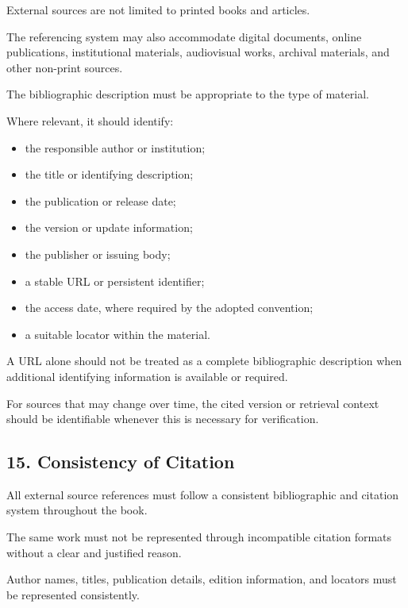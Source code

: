 External sources are not
limited to printed books
and articles.

The referencing system
may also accommodate
digital documents, online
publications, institutional
materials, audiovisual
works, archival materials,
and other non-print sources.

The bibliographic description
must be appropriate to
the type of material.

Where relevant, it should
identify:

\begin{itemize}
    \item the responsible
    author or institution;
    \item the title or identifying
    description;
    \item the publication
    or release date;
    \item the version or
    update information;
    \item the publisher or
    issuing body;
    \item a stable URL or
    persistent identifier;
    \item the access date,
    where required by the
    adopted convention;
    \item a suitable locator
    within the material.
\end{itemize}

A URL alone should not
be treated as a complete
bibliographic description
when additional identifying
information is available
or required.

For sources that may change
over time, the cited version
or retrieval context should
be identifiable whenever
this is necessary for
verification.


\subsection*{15. Consistency of Citation}

All external source references
must follow a consistent
bibliographic and citation
system throughout the book.

The same work must not
be represented through
incompatible citation
formats without a clear
and justified reason.

Author names, titles,
publication details, edition
information, and locators
must be represented
consistently.

